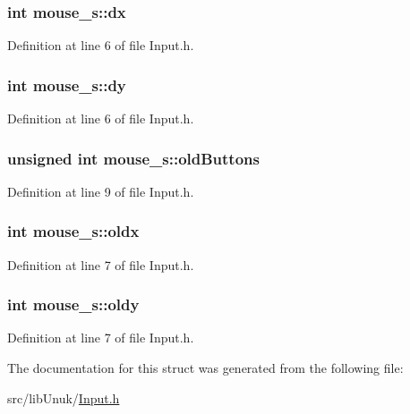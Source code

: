 \hypertarget{structmouse__s_a0e62a901adba2b5ad9a4683741e36066}{
\subsubsection[{dx}]{\setlength{\rightskip}{0pt plus 5cm}int {\bf mouse\_\-s::dx}}}
\label{structmouse__s_a0e62a901adba2b5ad9a4683741e36066}


Definition at line 6 of file Input.h.

\hypertarget{structmouse__s_a0307abea3a0b8bb5627ec454fec38b16}{
\subsubsection[{dy}]{\setlength{\rightskip}{0pt plus 5cm}int {\bf mouse\_\-s::dy}}}
\label{structmouse__s_a0307abea3a0b8bb5627ec454fec38b16}


Definition at line 6 of file Input.h.

\hypertarget{structmouse__s_ae3096aae24073ce4325cd97a211dfe83}{
\subsubsection[{oldButtons}]{\setlength{\rightskip}{0pt plus 5cm}unsigned int {\bf mouse\_\-s::oldButtons}}}
\label{structmouse__s_ae3096aae24073ce4325cd97a211dfe83}


Definition at line 9 of file Input.h.

\hypertarget{structmouse__s_a5f5a88b4a654513f521c431c76ae1aa2}{
\subsubsection[{oldx}]{\setlength{\rightskip}{0pt plus 5cm}int {\bf mouse\_\-s::oldx}}}
\label{structmouse__s_a5f5a88b4a654513f521c431c76ae1aa2}


Definition at line 7 of file Input.h.

\hypertarget{structmouse__s_ac1fd8b44363e16df9f9bf9786748207d}{
\subsubsection[{oldy}]{\setlength{\rightskip}{0pt plus 5cm}int {\bf mouse\_\-s::oldy}}}
\label{structmouse__s_ac1fd8b44363e16df9f9bf9786748207d}


Definition at line 7 of file Input.h.



The documentation for this struct was generated from the following file:\begin{DoxyCompactItemize}
\item 
src/libUnuk/\hyperlink{_input_8h}{Input.h}\end{DoxyCompactItemize}
